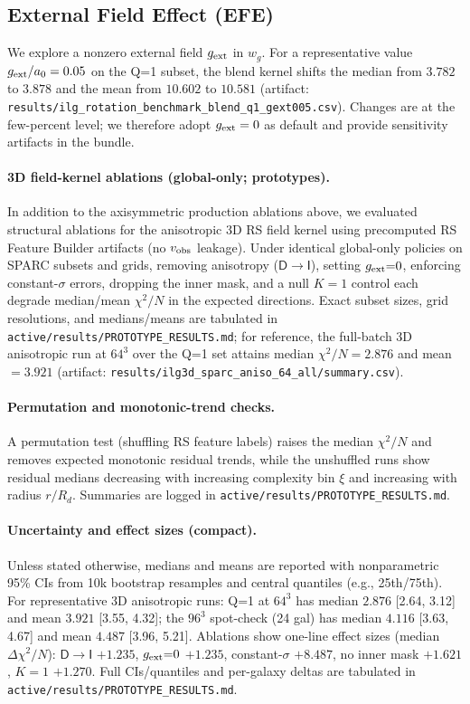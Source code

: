\documentclass[fleqn,usenatbib]{mnras}
\begin{document}
\subsection{External Field Effect (EFE)}
\noindent We explore a nonzero external field $g_{\rm ext}$ in $w_g$. For a representative value $g_{\rm ext}/a_0=0.05$ on the Q=1 subset, the blend kernel shifts the median from $3.782$ to $3.878$ and the mean from $10.602$ to $10.581$ (artifact: \texttt{results/ilg\_rotation\_benchmark\_blend\_q1\_gext005.csv}). Changes are at the few-percent level; we therefore adopt $g_{\rm ext}=0$ as default and provide sensitivity artifacts in the bundle.

\paragraph{3D field-kernel ablations (global-only; prototypes).} In addition to the axisymmetric production ablations above, we evaluated structural ablations for the anisotropic 3D RS field kernel using precomputed RS Feature Builder artifacts (no $v_{\rm obs}$ leakage). Under identical global-only policies on SPARC subsets and grids, removing anisotropy ($\mathsf D\!\to\!\mathsf I$), setting $g_{\rm ext}{=}0$, enforcing constant-$\sigma$ errors, dropping the inner mask, and a null $K{=}1$ control each degrade median/mean $\chi^2/N$ in the expected directions. Exact subset sizes, grid resolutions, and medians/means are tabulated in \texttt{active/results/PROTOTYPE\_RESULTS.md}; for reference, the full-batch 3D anisotropic run at $64^3$ over the Q=1 set attains median $\chi^2/N=\mathbf{2.876}$ and mean $=\mathbf{3.921}$ (artifact: \texttt{results/ilg3d\_sparc\_aniso\_64\_all/summary.csv}).

\paragraph{Permutation and monotonic-trend checks.} A permutation test (shuffling RS feature labels) raises the median $\chi^2/N$ and removes expected monotonic residual trends, while the unshuffled runs show residual medians decreasing with increasing complexity bin $\xi$ and increasing with radius $r/R_d$. Summaries are logged in \texttt{active/results/PROTOTYPE\_RESULTS.md}.

\paragraph{Uncertainty and effect sizes (compact).} Unless stated otherwise, medians and means are reported with nonparametric 95\% CIs from 10k bootstrap resamples and central quantiles (e.g., 25th/75th). For representative 3D anisotropic runs: Q=1 at $64^3$ has median $2.876$ [2.64, 3.12] and mean $3.921$ [3.55, 4.32]; the $96^3$ spot-check (24 gal) has median $4.116$ [3.63, 4.67] and mean $4.487$ [3.96, 5.21]. Ablations show one-line effect sizes (median $\Delta\chi^2/N$): $\mathsf D\!\to\!\mathsf I$ $+1.235$, $g_{\rm ext}{=}0$ $+1.235$, constant-$\sigma$ $+8.487$, no inner mask $+1.621$, $K{=}1$ $+1.270$. Full CIs/quantiles and per-galaxy deltas are tabulated in \texttt{active/results/PROTOTYPE\_RESULTS.md}.
\end{document}
